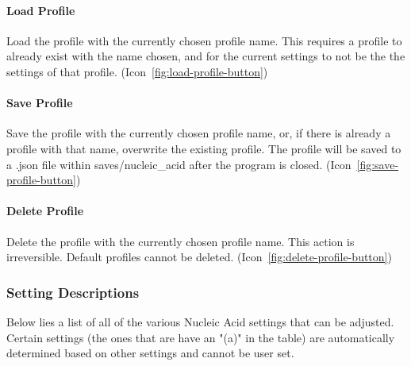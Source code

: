 \documentclass[titlepage]{article}
\begin{document}
	\paragraph{Load Profile}
	Load the profile with the currently chosen profile name. This requires a profile to already exist with the name chosen, and for the current settings to not be the  the settings of that profile. (Icon~\ref{fig:load-profile-button})
	
	\paragraph{Save Profile}
	Save the profile with the currently chosen profile name, or, if there is already a profile with that name, overwrite the existing profile. The profile will be saved to a .json file within saves/nucleic\_acid after the program is closed. (Icon~\ref{fig:save-profile-button})
	
	\paragraph{Delete Profile}
	Delete the profile with the currently chosen profile name. This action is irreversible. Default profiles cannot be deleted. (Icon~\ref{fig:delete-profile-button})

	\subsubsection{Setting Descriptions}
	Below lies a list of all of the various Nucleic Acid settings that can be adjusted. Certain settings (the ones that are have an "(a)" in the table) are automatically determined based on other settings and cannot be user set.
\end{document}
